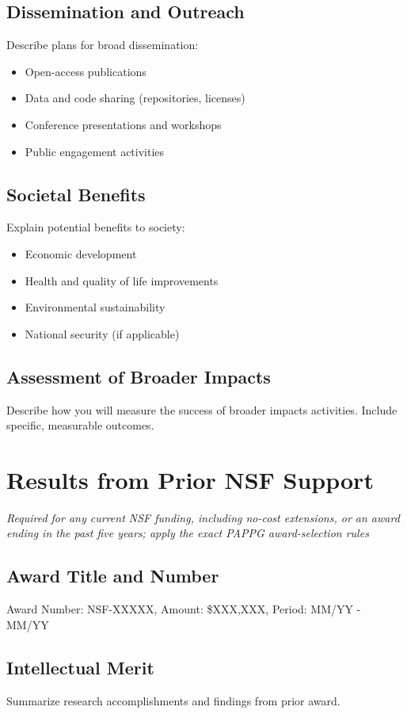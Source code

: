 \documentclass[11pt,letterpaper]{article}
\begin{document}
\subsection{Dissemination and Outreach}
Describe plans for broad dissemination:
\begin{itemize}
    \item Open-access publications
    \item Data and code sharing (repositories, licenses)
    \item Conference presentations and workshops
    \item Public engagement activities
\end{itemize}

\subsection{Societal Benefits}
Explain potential benefits to society:
\begin{itemize}
    \item Economic development
    \item Health and quality of life improvements
    \item Environmental sustainability
    \item National security (if applicable)
\end{itemize}

\subsection{Assessment of Broader Impacts}
Describe how you will measure the success of broader impacts activities. Include specific, measurable outcomes.

\section{Results from Prior NSF Support}
\textit{Required for any current NSF funding, including no-cost extensions, or an award ending in the past five years; apply the exact PAPPG award-selection rules}

\subsection{Award Title and Number}
Award Number: NSF-XXXXX, Amount: \$XXX,XXX, Period: MM/YY - MM/YY

\subsection{Intellectual Merit}
Summarize research accomplishments and findings from prior award.
\end{document}
